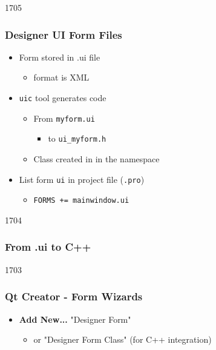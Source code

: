 \begin{slide}[fragile]{1705}
  \frametitle{Designer UI Form Files}
\begin{itemize}
\item Form stored in .ui file
  \begin{itemize}
  \item format is XML 
  \end{itemize}
\end{itemize}
\begin{itemize}
\item \texttt{uic} tool generates code
  \begin{itemize}
  \item From \texttt{myform.ui}
    \begin{itemize}
    \item to \texttt{ui\_myform.h}
    \end{itemize}
  \item Class created in in the  namespace
  \end{itemize}
\item List form \texttt{ui} in project file (\texttt{.pro})
  \begin{itemize}
  \item \texttt{FORMS += mainwindow.ui}
  \end{itemize}
\end{itemize}
\end{slide}

\begin{slide}[fragile]{1704}
\frametitle{From .ui to C++}
\end{slide}

\begin{slide}[fragile]{1703}
\frametitle{Qt Creator - Form Wizards}
\begin{itemize}
\item \textbf{Add New...} "Designer Form"
  \begin{itemize}
  \item or "Designer Form Class" (for C++ integration)
  \end{itemize}
\end{itemize}
\medskip
{}
\end{slide}

